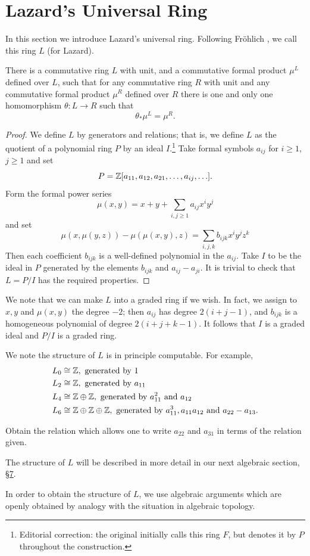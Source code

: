 \documentclass[../main]{subfiles}
\begin{document}
\chapter{Lazard's Universal Ring}
\label{sec:p2c5}

In this section we introduce Lazard's universal ring. Following Fr\"{o}hlich \cite{frolich}, we call this ring $L$ (for Lazard).

\begin{theorem}
\label{thm:p2c05.1}
There is a commutative ring $L$ with unit, and a commutative formal product $\mu^L$ defined over $L$, such that for any commutative ring $R$ with unit and any commutative formal product $\mu^R$ defined over $R$ there is one and only one homomorphism $\theta:L\longrightarrow R$ such that \[\theta_\ast\mu^L = \mu^R.\]
\end{theorem}
\begin{proof}
We define $L$ by generators and relations; that is, we define $L$ as the quotient of a polynomial ring $P$ by an ideal $I$.\footnote{Editorial correction: the original initially calls this ring $F$, but denotes it by $P$ throughout the construction.} Take formal symbols $a_{ij}$ for $i\ge 1$, $j\ge 1$ and set \[P = \mathbb{Z} [a_{11}, a_{12}, a_{21}, \ldots, a_{ij}, \ldots].\]
Form the formal power series \begin{equation}
\label{eqn:p2c05.2}
\tag{5.2}
\mu(x,y) = x+y+\sum_{i,j\ge 1} a_{ij} x^i y^j
\end{equation}
and set 
\begin{equation}
\label{eqn:p2c05.3}
\tag{5.3}
\mu(x, \mu(y,z)) - \mu(\mu(x,y),z) = \sum_{i,j,k} b_{ijk} x^i y^j z^k
\end{equation}
Then each coefficient $b_{ijk}$ is a well-defined polynomial in the $a_{ij}$. Take $I$ to be the ideal in $P$ generated by the elements $b_{ijk}$ and $a_{ij} - a_{ji}$. It is trivial to check that $L=P/I$ has the required properties. 
\end{proof}
We note that we can make $L$ into a graded ring if we wish. In fact, we assign to $x,y$ and $\mu(x,y)$ the degree $-2$; then $a_{ij}$ has degree $2(i+j-1)$, and $b_{ijk}$ is a homogeneous polynomial of degree $2(i+j+k-1)$. It follows that $I$ is a graded ideal and $P/I$ is a graded ring.

We note the structure of $L$ is in principle computable. For example, 
\begin{align*}
L_0 &\cong \mathbb{Z},\text{ generated by }1\\
L_2 &\cong \mathbb{Z},\text{ generated by }a_{11}\\
L_4 &\cong \mathbb{Z}\oplus\mathbb{Z},\text{ generated by }a^2_{11}\text{ and }a_{12}\\
L_6 &\cong \mathbb{Z}\oplus\mathbb{Z}\oplus\mathbb{Z},\text{ generated by }a^3_{11}, a_{11}a_{12}\text{ and }a_{22}-a_{13}.
\end{align*}
\begin{exercise}
Obtain the relation which allows one to write $a_{22}$ and $a_{31}$ in terms of the relation given.
\end{exercise}
The structure of $L$ will be described in more detail in our next algebraic section, \hyperref[sec:p2c7]{\S 7}. 

In order to obtain the structure of $L$, we use algebraic arguments which are openly obtained by analogy with the situation in algebraic topology. 
\end{document}
